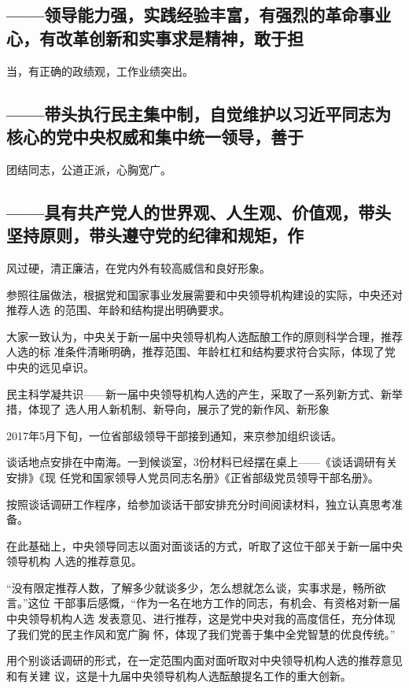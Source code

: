 \documentclass[11pt]{ctexart}
\begin{document}
{{{{\subsection{——领导能力强，实践经验丰富，有强烈的革命事业心，有改革创新和实事求是精神，敢于担}
\label{sec:org6a816f6}
当，有正确的政绩观，工作业绩突出。

\subsection{——带头执行民主集中制，自觉维护以习近平同志为核心的党中央权威和集中统一领导，善于}
\label{sec:orgb342120}
团结同志，公道正派，心胸宽广。

\subsection{——具有共产党人的世界观、人生观、价值观，带头坚持原则，带头遵守党的纪律和规矩，作}
\label{sec:org2b70f35}
风过硬，清正廉洁，在党内外有较高威信和良好形象。

参照往届做法，根据党和国家事业发展需要和中央领导机构建设的实际，中央还对推荐人选
的范围、年龄和结构提出明确要求。

大家一致认为，中央关于新一届中央领导机构人选酝酿工作的原则科学合理，推荐人选的标
准条件清晰明确，推荐范围、年龄杠杠和结构要求符合实际，体现了党中央的远见卓识。

民主科学凝共识——新一届中央领导机构人选的产生，采取了一系列新方式、新举措，体现了
选人用人新机制、新导向，展示了党的新作风、新形象

2017年5月下旬，一位省部级领导干部接到通知，来京参加组织谈话。

谈话地点安排在中南海。一到候谈室，3份材料已经摆在桌上——《谈话调研有关安排》《现
任党和国家领导人党员同志名册》《正省部级党员领导干部名册》。

按照谈话调研工作程序，给参加谈话干部安排充分时间阅读材料，独立认真思考准备。

在此基础上，中央领导同志以面对面谈话的方式，听取了这位干部关于新一届中央领导机构
人选的推荐意见。

“没有限定推荐人数，了解多少就谈多少，怎么想就怎么谈，实事求是，畅所欲言。”这位
干部事后感慨，“作为一名在地方工作的同志，有机会、有资格对新一届中央领导机构人选
发表意见、进行推荐，这是党中央对我的高度信任，充分体现了我们党的民主作风和宽广胸
怀，体现了我们党善于集中全党智慧的优良传统。”

用个别谈话调研的形式，在一定范围内面对面听取对中央领导机构人选的推荐意见和有关建
议，这是十九届中央领导机构人选酝酿提名工作的重大创新。

}}}}
\end{document}
